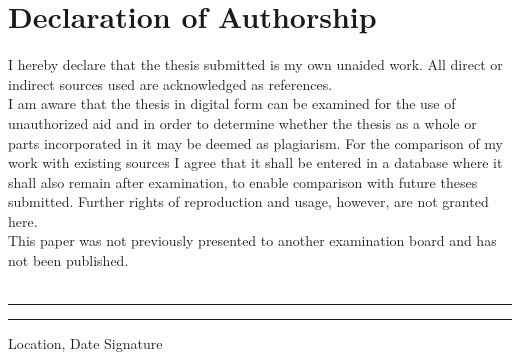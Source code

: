 \section*{Declaration of Authorship}
I hereby declare that the thesis submitted is my own unaided work. All direct or indirect sources used are acknowledged as references.\\
I am aware that the thesis in digital form can be examined for the use of unauthorized aid and in order to determine whether the thesis as a whole or parts incorporated in it may be deemed as plagiarism. For the comparison of my work with existing sources I agree that it shall be entered in a database where it shall also remain after examination, to enable comparison with future theses submitted. Further rights of reproduction and usage, however, are not granted here.\\
This paper was not previously presented to another examination board and has not been published.
~\\
~\\
\rule{0.35\textwidth}{0.4pt} \hspace*{3cm} \rule{0.45\textwidth}{0.4pt} \newline
Location, Date	\hspace*{5.7cm}	Signature
\newpage
